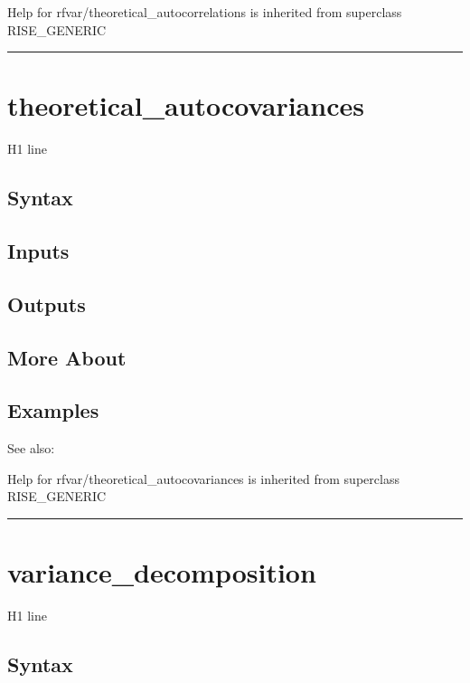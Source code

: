 \documentclass[letterpaper,10pt,english]{sphinxmanual}
\begin{document}
Help for rfvar/theoretical\_autocorrelations is inherited from superclass RISE\_GENERIC


\bigskip\hrule{}\bigskip



\section{theoretical\_autocovariances}
\label{classes/models/@rfvar/rfvar:id180}\label{classes/models/@rfvar/rfvar:theoretical-autocovariances}
H1 line


\subsection{Syntax}
\label{classes/models/@rfvar/rfvar:id181}

\subsection{Inputs}
\label{classes/models/@rfvar/rfvar:id182}

\subsection{Outputs}
\label{classes/models/@rfvar/rfvar:id183}

\subsection{More About}
\label{classes/models/@rfvar/rfvar:id184}

\subsection{Examples}
\label{classes/models/@rfvar/rfvar:id185}
See also:

Help for rfvar/theoretical\_autocovariances is inherited from superclass RISE\_GENERIC


\bigskip\hrule{}\bigskip



\section{variance\_decomposition}
\label{classes/models/@rfvar/rfvar:variance-decomposition}\label{classes/models/@rfvar/rfvar:id186}
H1 line


\subsection{Syntax}
\label{classes/models/@rfvar/rfvar:id187}
\end{document}
